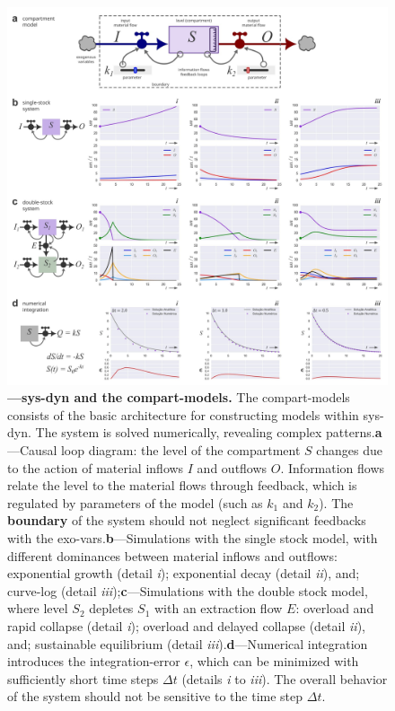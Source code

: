\documentclass[./main_en.tex]{subfiles}
\begin{document}
\begin{figure}[t!] %
	\centering				
	\includegraphics[width=0.95\linewidth]{figs/fig_dynamics_en.jpg}		
	\caption[\gls{sys-dyn} and the \gls{compart-models}]
	{\textbf{---\;\gls{sys-dyn} and the \gls{compart-models}.}\; The \gls{compart-models} consists of the basic architecture for constructing models within \gls{sys-dyn}. The \gls{system} is solved numerically, revealing complex patterns.\;\textbf{a}\;---\;Causal loop diagram: the level of the compartment $S$ changes due to the action of material inflows $I$ and outflows $O$. Information flows relate the level to the material flows through \gls{feedback}, which is regulated by \gls{parameters} of the \gls{model} (such as $k_1$ and $k_2$). The \textbf{boundary} of the \gls{system} should not neglect significant feedbacks with the \gls{exo-vars}.\;\textbf{b}\;---\;Simulations with the single stock \gls{model}, with different dominances between material inflows and outflows: exponential growth (detail \textrm{\textit{i}}); exponential decay (detail \textrm{\textit{ii}}), and; \gls{curve-log} (detail \textrm{\textit{iii}});\;\textbf{c}\;---\;Simulations with the double stock \gls{model}, where level $S_2$ depletes $S_1$ with an extraction flow $E$: overload and rapid collapse (detail \textrm{\textit{i}}); overload and delayed collapse (detail \textrm{\textit{ii}}), and; sustainable equilibrium (detail \textrm{\textit{iii}}).\;\textbf{d}\;---\;Numerical integration introduces the \gls{integration-error} $\epsilon$, which can be minimized with sufficiently short time steps $\Delta t$ (details \textrm{\textit{i}} to \textrm{\textit{iii}}). The overall behavior of the \gls{system} should not be sensitive to the time step $\Delta t$.
	}
\label{fig:sys:dynamics}  %
\end{figure}
\end{document}
